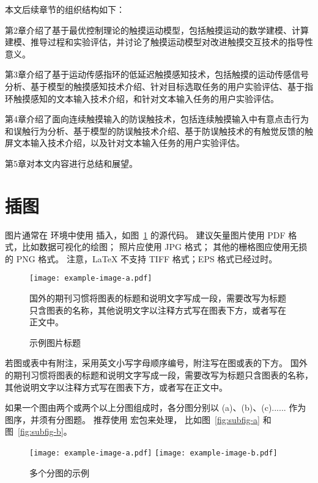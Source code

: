 本文后续章节的组织结构如下：

第2章介绍了基于最优控制理论的触摸运动模型，包括触摸运动的数学建模、计算建模、推导过程和实验评估，并讨论了触摸运动模型对改进触摸交互技术的指导性意义。

第3章介绍了基于运动传感指环的低延迟触摸感知技术，包括触摸的运动传感信号分析、基于模型的触摸感知技术介绍、针对目标选取任务的用户实验评估、基于指环触摸感知的文本输入技术介绍，和针对文本输入任务的用户实验评估。

第4章介绍了面向连续触摸输入的防误触技术，包括连续触摸输入中有意点击行为和误触行为分析、基于模型的防误触技术介绍、基于防误触技术的有触觉反馈的触屏文本输入技术介绍，以及针对文本输入任务的用户实验评估。

第5章对本文内容进行总结和展望。

\iffalse

\section{插图}

图片通常在  环境中使用  插入，如图~\ref{fig:example} 的源代码。
建议矢量图片使用 PDF 格式，比如数据可视化的绘图；
照片应使用 JPG 格式；
其他的栅格图应使用无损的 PNG 格式。
注意，LaTeX 不支持 TIFF 格式；EPS 格式已经过时。

\begin{figure}
	\centering
	\texttt{[image: example-image-a.pdf]}
	\caption*{国外的期刊习惯将图表的标题和说明文字写成一段，需要改写为标题只含图表的名称，其他说明文字以注释方式写在图表下方，或者写在正文中。}
	\caption{示例图片标题}
	\label{fig:example}
\end{figure}

若图或表中有附注，采用英文小写字母顺序编号，附注写在图或表的下方。
国外的期刊习惯将图表的标题和说明文字写成一段，需要改写为标题只含图表的名称，其他说明文字以注释方式写在图表下方，或者写在正文中。

如果一个图由两个或两个以上分图组成时，各分图分别以 (a)、(b)、(c)...... 作为图序，并须有分图题。
推荐使用  宏包来处理， 比如图~\ref{fig:subfig-a} 和图~\ref{fig:subfig-b}。

\begin{figure}
	\centering
	{\texttt{[image: example-image-a.pdf]}}
	{\texttt{[image: example-image-b.pdf]}}
	\caption{多个分图的示例}
	\label{fig:multi-image}
\end{figure}



